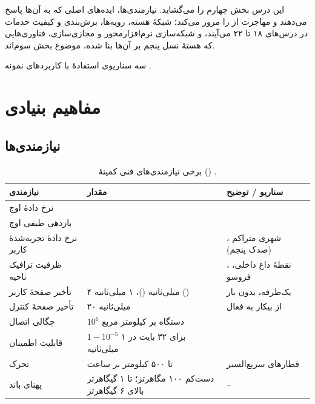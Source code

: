 \documentclass[11pt,a4paper]{article}
\begin{document}
این درس بخش چهارم را می‌گشاید. نیازمندی‌ها، ایده‌های اصلی  که به آن‌ها پاسخ می‌دهند و مهاجرت از  را مرور
می‌کند؛ شبکهٔ هسته، رویه‌ها، برش‌بندی و کیفیت خدمات در درس‌های ۱۸ تا ۲۲ می‌آیند، و شبکه‌سازی نرم‌افزارمحور و مجازی‌سازی،
فناوری‌هایی که هستهٔ نسل پنجم بر آن‌ها بنا شده، موضوع بخش سوم‌اند.

\begin{acnfigure}
  \caption{سه سناریوی استفادهٔ  با کاربردهای نمونه \cite{itu2015m2083}.}
  \label{fig:usage}
\end{acnfigure}

\section{مفاهیم بنیادی}

\subsection{نیازمندی‌ها}
\begin{table}[htbp]
\centering\small
\caption{برخی نیازمندی‌های فنی کمینهٔ  () \cite{itu2017m2410}.}\label{tab:req}
\begin{tabularx}{\linewidth}{@{}l l Y@{}}
\toprule
{}نیازمندی & مقدار & سناریو / توضیح \\
\midrule
نرخ دادهٔ اوج              &   &  \\
بازدهی طیفی اوج            &        &  \\
نرخ دادهٔ تجربه‌شدهٔ کاربر  &  & ، شهری متراکم (صدک پنجم) \\
ظرفیت ترافیک ناحیه         &              & ، نقطهٔ داغ داخلی، فروسو \\
تأخیر صفحهٔ کاربر          & ۴ میلی‌ثانیه ()، ۱ میلی‌ثانیه () & یک‌طرفه، بدون بار \\
تأخیر صفحهٔ کنترل          & ۲۰ میلی‌ثانیه                   & از بیکار به فعال \\
چگالی اتصال                & $10^6$ دستگاه بر کیلومتر مربع    &  \\
قابلیت اطمینان             & $1-10^{-5}$ برای ۳۲ بایت در ۱ میلی‌ثانیه &  \\
تحرک                       & تا ۵۰۰ کیلومتر بر ساعت          & قطارهای سریع‌السیر \\
پهنای باند                 & دست‌کم ۱۰۰ مگاهرتز؛ تا ۱ گیگاهرتز بالای ۶ گیگاهرتز & -- \\
\bottomrule
\end{tabularx}
\end{table}
\end{document}
